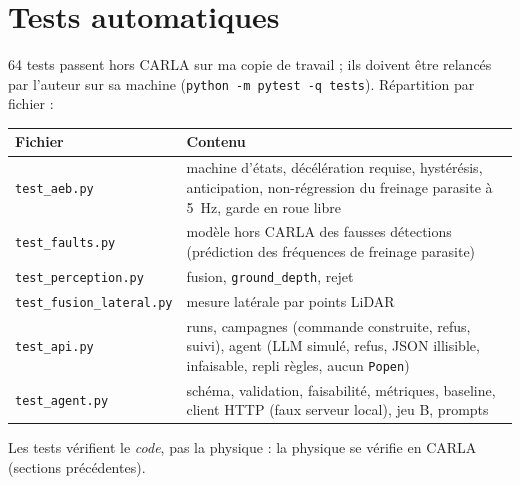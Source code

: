\documentclass[11pt,a4paper]{article}
\newcommand{\code}[1]{\texttt{#1}}
\begin{document}
\section{Tests automatiques}
64 tests passent hors CARLA sur ma copie de travail ; ils doivent \^etre relanc\'es par l'auteur sur sa machine (\code{python -m pytest -q tests}). R\'epartition par fichier :
\begin{center}\small\begin{tabular}{@{}lp{11.2cm}@{}}\toprule
Fichier & Contenu \\\midrule
\code{test\_aeb.py} & machine d'\'etats, d\'ec\'el\'eration requise, hyst\'er\'esis, anticipation, non-r\'egression du freinage parasite \`a 5~Hz, garde en roue libre \\
\code{test\_faults.py} & mod\`ele hors CARLA des fausses d\'etections (pr\'ediction des fr\'equences de freinage parasite) \\
\code{test\_perception.py} & fusion, \code{ground\_depth}, rejet \\
\code{test\_fusion\_lateral.py} & mesure lat\'erale par points LiDAR \\
\code{test\_api.py} & runs, campagnes (commande construite, refus, suivi), agent (LLM simul\'e, refus, JSON illisible, infaisable, repli r\`egles, aucun \code{Popen}) \\
\code{test\_agent.py} & sch\'ema, validation, faisabilit\'e, m\'etriques, baseline, client HTTP (faux serveur local), jeu B, prompts \\
\bottomrule\end{tabular}\end{center}
Les tests v\'erifient le \emph{code}, pas la physique : la physique se v\'erifie en CARLA (sections pr\'ec\'edentes).

\end{document}
